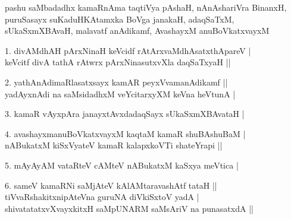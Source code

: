 \begin{entry}
\begin{shl}
\end{shl}
\smallskip
{}
\smallskip
\begin{shl}
pashu saMbadadhx kamaRnAma taqtiVya pAshaH, nAnAshariVra BinanxH,\\
puruSasayx suKaduHKAtamxka BoVga janakaH, adaqSaTxM,\\
sUkaSxmXBAvaH, malavatf anAdikamf, AvashayxM anuBoVkatxvayxM
\end{shl}
\smallskip
\begin{shl}
1. divAMdhAH pArxNinaH keVcidf rAtArxvaMdhAsatxthApareV |\\
keVcitf divA tathA rAtwrx pArxNinasutxvXla daqSaTxyaH ||
\end{shl}
\smallskip
{}
\smallskip
\begin{shl}
2. yathAnAdimaRlasatxsayx kamAR peyxVvamanAdikamf ||\\
yadAyxnAdi na saMsidadhxM veYcitarxyXM keVna heVtunA |
\end{shl}
\smallskip
{}
\smallskip
\begin{shl}
3. kamaR vAyxpAra janayxtAvxdadaqSayx sUkaSxmXBAvataH |
\end{shl}
\smallskip
{}
\smallskip
\begin{shl}
4. avashayxmanuBoVkatxvayxM kaqtaM kamaR shuBAshuBaM |\\
nABukatxM kiSxVyateV kamaR kalapxkoVTi shateYrapi ||
\end{shl}
\smallskip
{}
\smallskip
\begin{shl}
5. mAyAyAM vataRteV cAMteV nABukatxM kaSxya meVtica |
\end{shl}
\smallskip
{}
\smallskip
\begin{shl}
6. sameV kamaRNi saMjAteV kAlAMtaravashAtf tataH ||\\
tiVvaRshakitxnipAteVna guruNA diVkiSxtoV yadA |\\
shivatatatxvXvayxkitxH saMpUNARM saMsAriV na punasatxdA ||
\end{shl}
\smallskip
{}
\medskip
{}

\end{entry}
